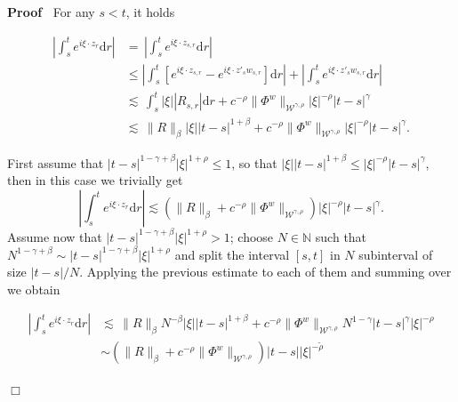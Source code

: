 \documentclass[10pt]{article}
\newcommand{\mathd}{\mathrm{d}}
\newenvironment{proof}{\noindent\textbf{Proof\ }}{\hspace*{\fill}$\Box$\medskip}
\begin{document}
\begin{proof}
  For any $s < t$, it holds
  
  \begin{align*}
    \left| \int_s^t e^{i \xi \cdot z_r} \mathd r \right| & = \, \left|
    \int_s^t e^{i \xi \cdot z_{s, r}} \mathd r \right|\\
    & \leqslant \left| \int_s^t [e^{i \xi \cdot z_{s, r}} - e^{i \xi \cdot
    z'_s w_{s, r}}] \mathd r \right| + \left| \int_s^t e^{i \xi \cdot z'_s
    w_{s, r}} \mathd r \right|\\
    & \lesssim \, \int_s^t | \xi | | R_{s, r} | \mathd r + c^{- \rho} \|
    \Phi^w \|_{\mathcal{W}^{\gamma, \rho}} | \xi |^{- \rho} | t - s
    |^{\gamma}\\
    & \lesssim \, \| R \|_{\beta} | \xi | | t - s |^{1 + \beta} + c^{- \rho}
    \| \Phi^w \|_{\mathcal{W}^{\gamma, \rho}} | \xi |^{- \rho} | t - s
    |^{\gamma} .
  \end{align*}
  
  First assume that $| t - s |^{1 - \gamma + \beta} | \xi |^{1 + \rho}
  \leqslant 1$, so that $| \xi | | t - s |^{1 + \beta} \leqslant | \xi |^{-
  \rho} | t - s |^{\gamma}$, then in this case we trivially get
  \begin{equation}
    \left| \int_s^t e^{i \xi \cdot z_r} \mathd r \right| \lesssim (\| R
    \|_{\beta} + c^{- \rho} \| \Phi^w \|_{\mathcal{W}^{\gamma, \rho}}) | \xi
    |^{- \rho} | t - s |^{\gamma} . \label{sec5.3 eq1}
  \end{equation}
  Assume now that $| t - s |^{1 - \gamma + \beta} | \xi |^{1 + \rho} > 1$;
  choose $N \in \mathbb{N}$ such that $N^{1 - \gamma + \beta} \sim | t - s
  |^{1 - \gamma + \beta} | \xi |^{1 + \rho}$ and split the interval $[s, t]$
  in $N$ subinterval of size $| t - s | / N$. Applying the previous estimate
  to each of them and summing over we obtain
  
  \begin{align*}
    \left| \int_s^t e^{i \xi \cdot z_r} \mathd r \right| & \lesssim \, \| R
    \|_{\beta} N^{- \beta} | \xi | | t - s |^{1 + \beta} + c^{- \rho} \|
    \Phi^w \|_{\mathcal{W}^{\gamma, \rho}} N^{1 - \gamma} | t - s |^{\gamma} |
    \xi |^{- \rho}\\
    & \sim (\| R \|_{\beta} + c^{- \rho} \| \Phi^w \|_{\mathcal{W}^{\gamma,
    \rho}}) | t - s |  | \xi |^{- \tilde{\rho}}
  \end{align*}
  

\end{proof}
\end{document}
